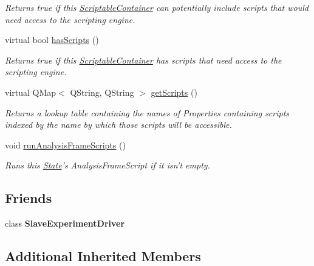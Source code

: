 \begin{DoxyCompactItemize}
\begin{DoxyCompactList}\small\item\em Returns true if this \hyperlink{class_picto_1_1_scriptable_container}{Scriptable\-Container} can potentially include scripts that would need access to the scripting engine. \end{DoxyCompactList}\item 
virtual bool \hyperlink{class_picto_1_1_state_a3f93984faa13013b77ee0fc677e206ea}{has\-Scripts} ()
\begin{DoxyCompactList}\small\item\em Returns true if this \hyperlink{class_picto_1_1_scriptable_container}{Scriptable\-Container} has scripts that need access to the scripting engine. \end{DoxyCompactList}\item 
virtual Q\-Map$<$ Q\-String, Q\-String $>$ \hyperlink{class_picto_1_1_state_a5cfa78b269e1da7a66b26fa13427c5e3}{get\-Scripts} ()
\begin{DoxyCompactList}\small\item\em Returns a lookup table containing the names of Properties containing scripts indexed by the name by which those scripts will be accessible. \end{DoxyCompactList}\item 
\hypertarget{class_picto_1_1_state_a23492e6c360fd720dc6b2ec1147049da}{void \hyperlink{class_picto_1_1_state_a23492e6c360fd720dc6b2ec1147049da}{run\-Analysis\-Frame\-Scripts} ()}\label{class_picto_1_1_state_a23492e6c360fd720dc6b2ec1147049da}

\begin{DoxyCompactList}\small\item\em Runs this \hyperlink{class_picto_1_1_state}{State}'s Analysis\-Frame\-Script if it isn't empty. \end{DoxyCompactList}\end{DoxyCompactItemize}
\subsection*{Friends}
\begin{DoxyCompactItemize}
\item 
\hypertarget{class_picto_1_1_state_a90c7971ba26fd5050e30ed8ff64e0e29}{class {\bfseries Slave\-Experiment\-Driver}}\label{class_picto_1_1_state_a90c7971ba26fd5050e30ed8ff64e0e29}

\end{DoxyCompactItemize}
\subsection*{Additional Inherited Members}


